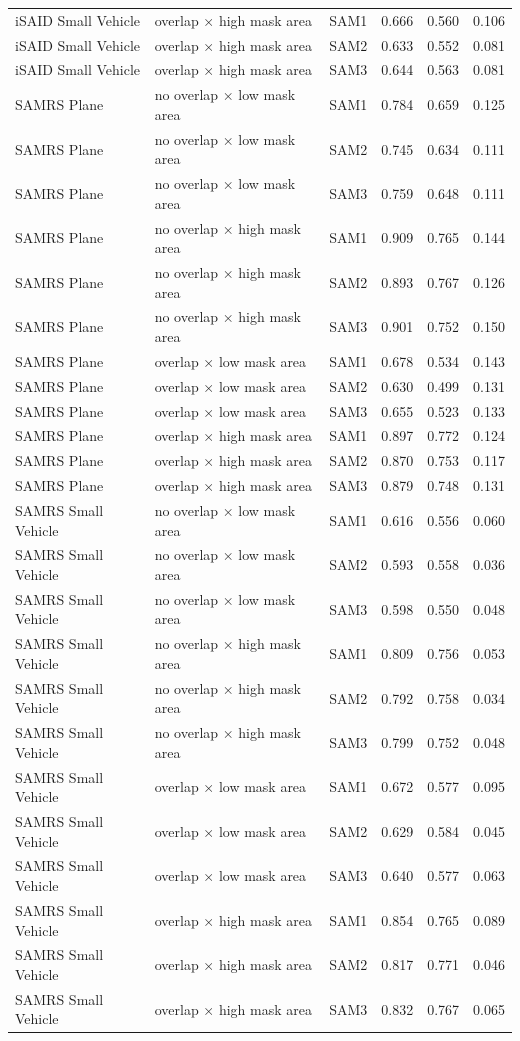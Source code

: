 \begin{tabular}{llllll}
iSAID Small Vehicle & overlap × high mask area & SAM1 & 0.666 & 0.560 & 0.106 \\
iSAID Small Vehicle & overlap × high mask area & SAM2 & 0.633 & 0.552 & 0.081 \\
iSAID Small Vehicle & overlap × high mask area & SAM3 & 0.644 & 0.563 & 0.081 \\
SAMRS Plane & no overlap × low mask area & SAM1 & 0.784 & 0.659 & 0.125 \\
SAMRS Plane & no overlap × low mask area & SAM2 & 0.745 & 0.634 & 0.111 \\
SAMRS Plane & no overlap × low mask area & SAM3 & 0.759 & 0.648 & 0.111 \\
SAMRS Plane & no overlap × high mask area & SAM1 & 0.909 & 0.765 & 0.144 \\
SAMRS Plane & no overlap × high mask area & SAM2 & 0.893 & 0.767 & 0.126 \\
SAMRS Plane & no overlap × high mask area & SAM3 & 0.901 & 0.752 & 0.150 \\
SAMRS Plane & overlap × low mask area & SAM1 & 0.678 & 0.534 & 0.143 \\
SAMRS Plane & overlap × low mask area & SAM2 & 0.630 & 0.499 & 0.131 \\
SAMRS Plane & overlap × low mask area & SAM3 & 0.655 & 0.523 & 0.133 \\
SAMRS Plane & overlap × high mask area & SAM1 & 0.897 & 0.772 & 0.124 \\
SAMRS Plane & overlap × high mask area & SAM2 & 0.870 & 0.753 & 0.117 \\
SAMRS Plane & overlap × high mask area & SAM3 & 0.879 & 0.748 & 0.131 \\
SAMRS Small Vehicle & no overlap × low mask area & SAM1 & 0.616 & 0.556 & 0.060 \\
SAMRS Small Vehicle & no overlap × low mask area & SAM2 & 0.593 & 0.558 & 0.036 \\
SAMRS Small Vehicle & no overlap × low mask area & SAM3 & 0.598 & 0.550 & 0.048 \\
SAMRS Small Vehicle & no overlap × high mask area & SAM1 & 0.809 & 0.756 & 0.053 \\
SAMRS Small Vehicle & no overlap × high mask area & SAM2 & 0.792 & 0.758 & 0.034 \\
SAMRS Small Vehicle & no overlap × high mask area & SAM3 & 0.799 & 0.752 & 0.048 \\
SAMRS Small Vehicle & overlap × low mask area & SAM1 & 0.672 & 0.577 & 0.095 \\
SAMRS Small Vehicle & overlap × low mask area & SAM2 & 0.629 & 0.584 & 0.045 \\
SAMRS Small Vehicle & overlap × low mask area & SAM3 & 0.640 & 0.577 & 0.063 \\
SAMRS Small Vehicle & overlap × high mask area & SAM1 & 0.854 & 0.765 & 0.089 \\
SAMRS Small Vehicle & overlap × high mask area & SAM2 & 0.817 & 0.771 & 0.046 \\
SAMRS Small Vehicle & overlap × high mask area & SAM3 & 0.832 & 0.767 & 0.065 \\
\bottomrule
\end{tabular}
